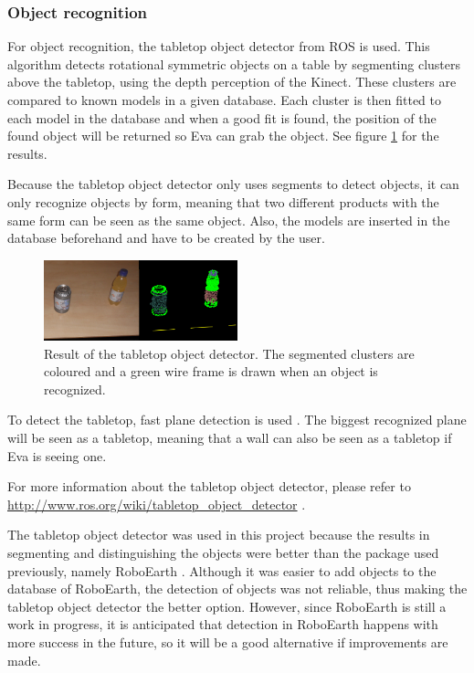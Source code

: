 \documentclass[project_eva.tex]{subfiles}
\begin{document}
\subsubsection*{Object recognition}
For object recognition, the tabletop object detector from ROS is used. This algorithm detects rotational symmetric 
objects on a table by segmenting clusters above the tabletop, using the depth perception of the Kinect. These clusters are compared to known models in a given database. 
Each cluster is then fitted to each model in the database and when a good fit is found, the position of the found object 
will be returned so Eva can grab the object. See figure \ref{fig:tabletop} for the results.

Because the tabletop object detector only uses segments to detect objects, it can only recognize objects by form, meaning 
that two different products with the same form can be seen as the same object. Also, the models are inserted in the 
database beforehand and have to be created by the user.

\begin{figure}[h]
	\centering
	\mbox{\includegraphics[width=0.5\textwidth]{Images/object_detector.png}}
	\caption{Result of the tabletop object detector. The segmented clusters are coloured and a green wire frame is drawn 
	when an object is recognized.}
	\label{fig:tabletop}
\end{figure}

To detect the tabletop, fast plane detection is used \cite{plane}. The biggest recognized plane will be seen as a 
tabletop, meaning that a wall can also be seen as a 
tabletop if Eva is seeing one.

For more information about the tabletop object detector, please refer to 
\url{http://www.ros.org/wiki/tabletop\_object\_detector} \cite{tabletop}.

The tabletop object detector was used in this project because the results in segmenting and distinguishing the objects 
were better than the package used previously, namely RoboEarth \cite{Roboearth}. Although it was easier to add objects to 
the database of RoboEarth, the detection of objects was not reliable, thus making the tabletop object detector the 
better option. However, since RoboEarth is still a work in progress, it is anticipated that detection in RoboEarth 
happens with more success in the future, so it will be a good alternative if improvements are made.
\end{document}
